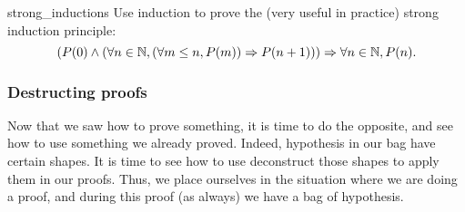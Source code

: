 \begin{cex}{}{strong_inductions}
    Use induction to prove the (very useful in practice) strong induction principle:
    \begin{equation*}
        \left(P(0) \land (\forall n \in \mathbb{N}, (\forall m \le n, P(m)) \Rightarrow P(n+1)) \right) \Rightarrow \forall n \in \mathbb{N}, P(n).
    \end{equation*} 
\end{cex}
\subsubsection{Destructing proofs}

Now that we saw how to prove something, it is time to do the opposite, and see how to use something we already proved. Indeed, hypothesis in our bag have certain shapes. It is time to see how to use deconstruct those shapes to apply them in our proofs. Thus, we place ourselves in the situation where we are doing a proof, and during this proof (as always) we have a bag of hypothesis.
